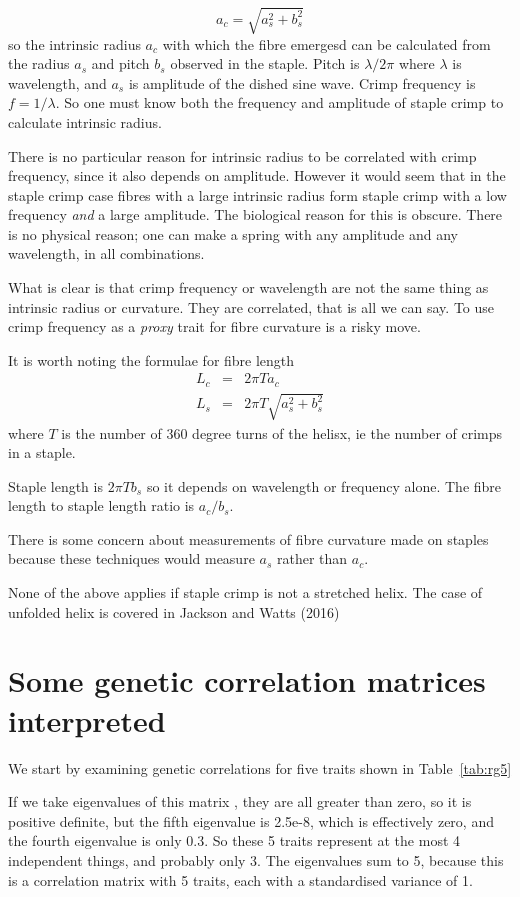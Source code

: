 \documentclass{article}
\begin{document}
\begin{displaymath}
a_{c}   =  \sqrt{a_{s}^{2} + b_{s}^{2}}
\end{displaymath}
so the intrinsic radius $a_{c}$ with which the fibre emergesd can be calculated from the radius $a_{s}$ and pitch $b_{s}$ observed in the staple. Pitch is $\lambda/2\pi$ where $\lambda$ is wavelength, and $a_{s}$ is amplitude of the dished sine wave. Crimp frequency is $f = 1/\lambda$. So one must know both the frequency and amplitude of staple crimp to calculate intrinsic radius. 

There is no particular reason for intrinsic radius to be correlated with crimp frequency, since it also depends on amplitude. However it would seem that in the staple crimp case fibres with a large intrinsic radius form staple crimp with a low frequency {\em and}  a large amplitude. The biological reason for this is obscure. There is no physical reason; one can make a spring with any amplitude and any wavelength, in all combinations.

What is clear is that crimp frequency or wavelength are not the same thing as intrinsic radius or curvature. They are correlated, that is all we can say. To use crimp frequency as a {\em proxy} trait for fibre curvature is a risky move.

It is worth noting the formulae for fibre length
\begin{eqnarray*}
 L_{c} & = & 2 \pi T a_{c}  \\
 L_{s} & = & 2 \pi T \sqrt{a_{s}^{2} + b_{s}^{2}}
\end{eqnarray*}
where $T$ is the number of 360 degree turns of the helisx, ie the number of crimps in a staple.

Staple length is $2 \pi T b_{s}$ so it depends on wavelength or frequency alone. The fibre length to staple length ratio is $a_{c}/b_{s}$. 

There is some concern about measurements of fibre curvature made on staples because these techniques would measure $a_{s}$ rather than $a_{c}$.

None of the above applies if staple crimp is not a stretched helix. The case of unfolded helix is covered in Jackson and Watts (2016)~\cite{jackson-2016a}

\section{Some genetic correlation matrices interpreted}
We start by examining genetic correlations for five traits shown in Table~\ref{tab:rg5}

If we take eigenvalues of this matrix , they are all greater than zero, so it is positive definite, but the fifth eigenvalue is 2.5e-8, which is effectively zero, and the fourth eigenvalue is only 0.3.  So these 5 traits represent at the most 4 independent things, and probably only 3.  The eigenvalues sum to 5, because this is a correlation matrix with 5 traits, each with a standardised variance of 1.
\end{document}
